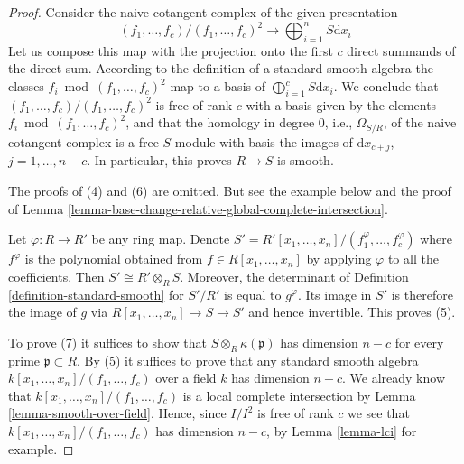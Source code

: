\begin{proof}
Consider the naive cotangent complex of the given presentation
$$
(f_1, \ldots, f_c)/(f_1, \ldots, f_c)^2
\longrightarrow
\bigoplus\nolimits_{i = 1}^n S \text{d}x_i
$$
Let us compose this map with the projection onto the first $c$ direct summands
of the direct sum. According to the definition of a standard smooth
algebra the classes $f_i \bmod (f_1, \ldots, f_c)^2$ map to a basis of
$\bigoplus_{i = 1}^c S\text{d}x_i$. We conclude that
$(f_1, \ldots, f_c)/(f_1, \ldots, f_c)^2$ is free of rank $c$ with
a basis given by the elements $f_i \bmod (f_1, \ldots, f_c)^2$, and
that the homology in degree $0$, i.e., $\Omega_{S/R}$,
of the naive cotangent complex is a free $S$-module with basis the images of
$\text{d}x_{c + j}$, $j = 1, \ldots, n - c$.
In particular, this proves $R \to S$ is smooth.

\medskip\noindent
The proofs of (4) and (6) are omitted. But see the example below and
the proof of
Lemma \ref{lemma-base-change-relative-global-complete-intersection}.

\medskip\noindent
Let $\varphi : R \to R'$ be any ring map.
Denote $S' = R'[x_1, \ldots, x_n]/(f_1^\varphi, \ldots, f_c^\varphi)$
where $f^\varphi$ is the polynomial obtained from $f \in R[x_1, \ldots, x_n]$
by applying $\varphi$ to all the coefficients. Then $S' \cong R' \otimes_R S$.
Moreover, the determinant of Definition \ref{definition-standard-smooth}
for $S'/R'$ is equal to $g^\varphi$. Its image in $S'$ is therefore
the image of $g$ via $R[x_1, \ldots, x_n] \to S \to S'$
and hence invertible. This proves (5).

\medskip\noindent
To prove (7) it suffices to show that
$S \otimes_R \kappa(\mathfrak p)$ has dimension $n - c$
for every prime $\mathfrak p \subset R$.
By (5) it suffices to prove that any standard smooth
algebra $k[x_1, \ldots, x_n]/(f_1, \ldots, f_c)$
over a field $k$ has dimension $n - c$. We already
know that $k[x_1, \ldots, x_n]/(f_1, \ldots, f_c)$ is a local
complete intersection by Lemma \ref{lemma-smooth-over-field}.
Hence, since $I/I^2$ is free of rank $c$ we see that
$k[x_1, \ldots, x_n]/(f_1, \ldots, f_c)$ has dimension
$n - c$, by Lemma \ref{lemma-lci} for example.
\end{proof}

